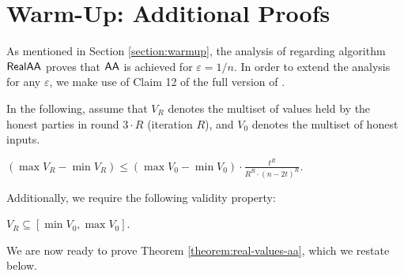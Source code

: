\section{Warm-Up: Additional Proofs} \label{appendix:realvalues}

As mentioned in Section \ref{section:warmup}, the analysis of \cite{BenDoHo10} regarding algorithm $\textsf{RealAA}$ proves that $\textsf{AA}$ is achieved for $\varepsilon = 1/n$. In order to extend the analysis for any $\varepsilon$, we make use of Claim 12 of the full version  \cite{BDH10} of \cite{BenDoHo10}.


In the following, assume that $V_{R}$ denotes the multiset of values held by the honest parties in round $3 \cdot R$ (iteration $R$), and $V_0$ denotes the multiset of honest inputs.

\begin{lemma}
    \label{lmm:Claim12}
    $(\max V_R - \min V_{R}) \leq (\max V_0 - \min V_0) \cdot \frac{t^R}{R^R \cdot (n - 2t)^R}$. 
\end{lemma}

Additionally, we require the following validity property:
\begin{lemma} \label{lemma:claim8}
    $V_R \subseteq [\min V_0, \max V_0]$.
\end{lemma}

We are now ready to prove Theorem \ref{theorem:real-values-aa}, which we restate below.

